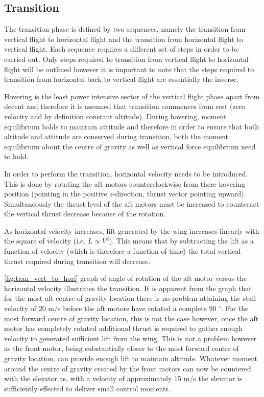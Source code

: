 \subsection{Transition}
The transition phase is defined by two sequences, namely the transition from vertical flight to horizontal flight and the transition from horizontal flight to vertical flight. Each sequence requires a different set of steps in order to be carried out. Only steps required to transition from vertical flight to horizontal flight will be outlined however it is important to note that the steps required to transition from horizontal back to vertical flight are essentially the inverse. %

Hovering is the least power intensive sector of the vertical flight phase apart from decent and therefore it is assumed that transition commences from rest (zero velocity and by definition constant altitude). During hovering, moment equilibrium holds to maintain attitude and therefore in order to ensure that both altitude and attitude are conserved during transition, both the moment equilibrium about the centre of gravity as well as vertical force equilibrium need to hold.

In order to perform the transition, horizontal velocity needs to be introduced. This is done by rotating the aft motors counterclockwise from there hovering position (pointing in the positive $z$-direction, thrust vector pointing upward). Simultaneously the thrust level of the aft motors must be increased to counteract the vertical thrust decrease because of the rotation.

As horizontal velocity increases, lift generated by the wing increases linearly with the square of velocity (i.e. $L \propto V^2$). This means that by subtracting the lift as a function of velocity (which is therefore a function of time) the total vertical thrust required during transition will decrease. 

\autoref{fig:tran_vert_to_hori} graph of angle of rotation of the aft motor versus the horizontal velocity illustrates the transition. It is apparent from the graph that for the most aft centre of gravity location there is no problem attaining the stall velocity of 20 m/s before the aft motors have rotated a complete 90 $^{\circ}$. For the most forward centre of gravity location, this is not the case however, once the aft motor has completely rotated additional thrust is required to gather enough velocity to generated sufficient lift from the wing. This is not a problem however as the front motor, being substantially closer to the most forward centre of gravity location, can provide enough lift to maintain altitude. Whatever moment around the centre of gravity created by the front motors can now be countered with the elevator as, with a velocity of approximately 15 m/s the elevator is sufficiently effected to deliver small control moments. 

